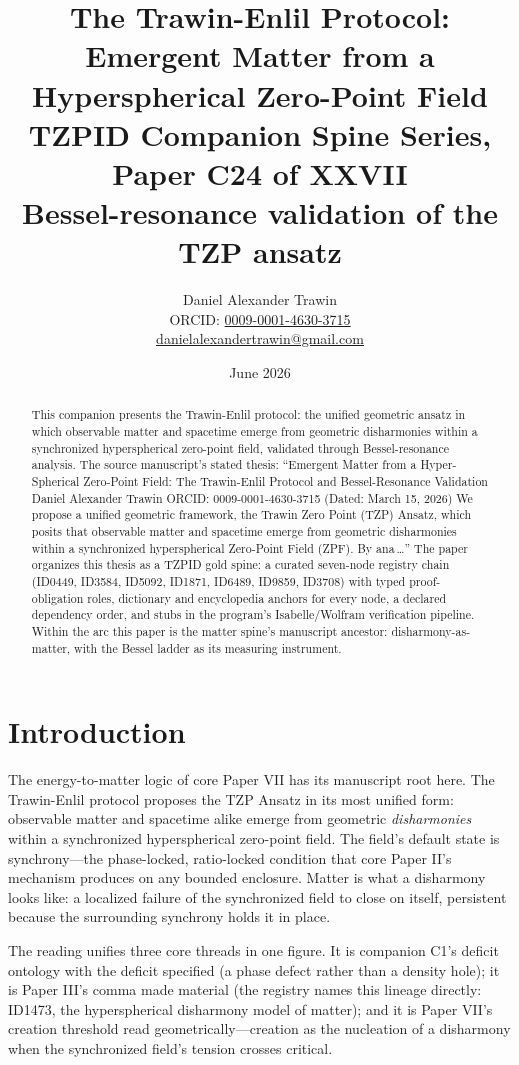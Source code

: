 \documentclass[11pt]{article}
\title{The Trawin-Enlil Protocol: Emergent Matter from a Hyperspherical Zero-Point Field\\[0.6em]
\large TZPID Companion Spine Series, Paper C24 of XXVII\\
\normalsize Bessel-resonance validation of the TZP ansatz}
\author{Daniel Alexander Trawin\\
\small ORCID: \href{https://orcid.org/0009-0001-4630-3715}{0009-0001-4630-3715}\\
\small \href{mailto:danielalexandertrawin@gmail.com}{danielalexandertrawin@gmail.com}}
\date{June 2026}
\theoremstyle{remark}
\begin{document}
\maketitle

\begin{abstract}
This companion presents the Trawin-Enlil protocol: the unified geometric ansatz in which observable matter and spacetime emerge from geometric disharmonies within a synchronized hyperspherical zero-point field, validated through Bessel-resonance analysis.
The source manuscript's stated thesis: ``Emergent Matter from a Hyper-Spherical Zero-Point Field: The Trawin-Enlil Protocol and Bessel-Resonance Validation Daniel Alexander Trawin ORCID: 0009-0001-4630-3715 (Dated: March 15, 2026) We propose a unified geometric framework, the Trawin Zero Point (TZP) Ansatz, which posits that observable matter and spacetime emerge from geometric disharmonies within a synchronized hyperspherical Zero-Point Field (ZPF). By ana\,\ldots'' The paper organizes this thesis as a TZPID gold spine: a curated seven-node registry chain (ID0449, ID3584, ID5092, ID1871, ID6489, ID9859, ID3708) with typed proof-obligation roles, dictionary and encyclopedia anchors for every node, a declared dependency order, and stubs in the program's Isabelle/Wolfram verification pipeline. Within the arc this paper is the matter spine's manuscript ancestor: disharmony-as-matter, with the Bessel ladder as its measuring instrument.
\end{abstract}

\section{Introduction}
\label{sec:intro}

The energy-to-matter logic of core Paper VII has its manuscript root here. The Trawin-Enlil protocol proposes the TZP Ansatz in its most unified form: observable matter and spacetime alike emerge from geometric \emph{disharmonies} within a synchronized hyperspherical zero-point field. The field's default state is synchrony---the phase-locked, ratio-locked condition that core Paper II's mechanism produces on any bounded enclosure. Matter is what a disharmony looks like: a localized failure of the synchronized field to close on itself, persistent because the surrounding synchrony holds it in place.

The reading unifies three core threads in one figure. It is companion C1's deficit ontology with the deficit specified (a phase defect rather than a density hole); it is Paper III's comma made material (the registry names this lineage directly: ID1473, the hyperspherical disharmony model of matter); and it is Paper VII's creation threshold read geometrically---creation as the nucleation of a disharmony when the synchronized field's tension crosses critical.
\end{document}

